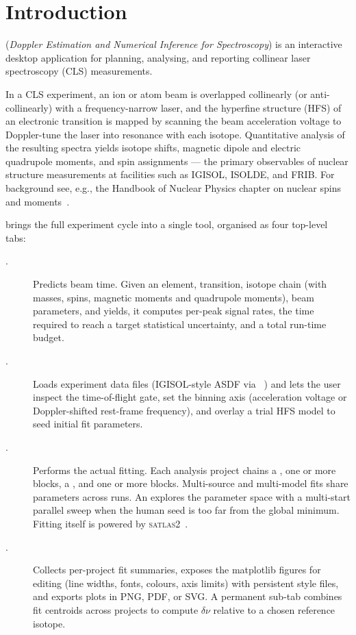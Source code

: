\section{Introduction}
\label{sec:introduction}

\denis{} (\emph{Doppler Estimation and Numerical Inference for
Spectroscopy}) is an interactive desktop application for planning,
analysing, and reporting collinear laser spectroscopy (CLS)
measurements.

In a CLS experiment, an ion or atom beam is overlapped collinearly (or
anti-collinearly) with a frequency-narrow laser, and the hyperfine
structure (HFS) of an electronic transition is mapped by scanning the
beam acceleration voltage to Doppler-tune the laser into resonance with
each isotope. Quantitative analysis of the resulting spectra yields
isotope shifts, magnetic dipole and electric quadrupole moments, and
spin assignments --- the primary observables of nuclear structure
measurements at facilities such as IGISOL, ISOLDE, and FRIB. For
background see, e.g., the Handbook of Nuclear Physics chapter on
nuclear spins and moments~\cite{cls_handbook}.

\denis{} brings the full experiment cycle into a single tool, organised
as four top-level tabs:

\begin{description}
    \item[.]
        Predicts beam time. Given an element, transition, isotope chain
        (with masses, spins, magnetic moments and quadrupole moments),
        beam parameters, and yields, it computes per-peak signal rates,
        the time required to reach a target statistical uncertainty,
        and a total run-time budget.
    \item[.]
        Loads experiment data files (IGISOL-style ASDF via
        ~\cite{clstools}) and lets the user inspect the
        time-of-flight gate, set the binning axis (acceleration voltage
        or Doppler-shifted rest-frame frequency), and overlay a trial
        HFS model to seed initial fit parameters.
    \item[.]
        Performs the actual fitting. Each analysis project chains a
        , one or more  blocks, a ,
        and one or more  blocks. Multi-source and
        multi-model fits share parameters across runs. An
         explores the parameter space with a
        multi-start parallel  sweep when the human seed
        is too far from the global minimum. Fitting itself is powered
        by \textsc{satlas2}~\cite{satlas2}.
    \item[.]
        Collects per-project fit summaries, exposes the matplotlib
        figures for editing (line widths, fonts, colours, axis limits)
        with persistent style files, and exports plots in PNG, PDF, or
        SVG. A permanent  sub-tab combines fit
        centroids across projects to compute $\delta\nu$ relative to a
        chosen reference isotope.
\end{description}

